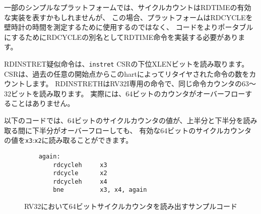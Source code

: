 \begin{commentary}
\begin{comment}
On some simple platforms, cycle count might represent a valid
implementation of RDTIME, but in this case, platforms should implement
the RDTIME instruction as an alias for RDCYCLE to make code more
portable, rather than using RDCYCLE to measure wall-clock time.
\end{comment}

一部のシンプルなプラットフォームでは、サイクルカウントはRDTIMEの有効な実装を表すかもしれませんが、
この場合、プラットフォームはRDCYCLEを壁時計の時間を測定するために使用するのではなく、
コードをよりポータブルにするためにRDCYCLEの別名としてRDTIME命令を実装する必要があります。

\end{commentary}

\begin{comment}
The RDINSTRET pseudoinstruction reads the low XLEN bits of the {\tt
  instret} CSR, which counts the number of instructions retired by
this hart from some arbitrary start point in the past.  RDINSTRETH is
an RV32I-only instruction that reads bits 63--32 of the same
instruction counter. The underlying 64-bit counter should never
overflow in practice.
\end{comment}

RDINSTRET疑似命令は、{\tt instret} CSRの下位XLENビットを読み取ります。
CSRは、過去の任意の開始点からこのhartによってリタイヤされた命令の数をカウントします。
RDINSTRETHはRV32I専用の命令で、同じ命令カウンタの63～32ビットを読み取ります。
実際には、64ビットのカウンタがオーバーフローすることはありません。

\begin{comment}
The following code sequence will read a valid 64-bit cycle counter value into
{\tt x3}:{\tt x2}, even if the counter overflows its lower half between reading its upper
and lower halves.
\end{comment}

以下のコードでは、64ビットのサイクルカウンタの値が、上半分と下半分を読み取る間に下半分がオーバーフローしても、
有効な64ビットのサイクルカウンタの値を{\tt x3}:{\tt x2}に読み取ることができます。

\begin{figure}[h!]
\begin{center}
\begin{verbatim}
    again:
        rdcycleh     x3
        rdcycle      x2
        rdcycleh     x4
        bne          x3, x4, again
\end{verbatim}
\end{center}
\begin{comment}
\caption{Sample code for reading the 64-bit cycle counter in RV32.}
\end{comment}
\caption{RV32において64ビットサイクルカウンタを読み出すサンプルコード}
\label{rdcycle}
\end{figure}

